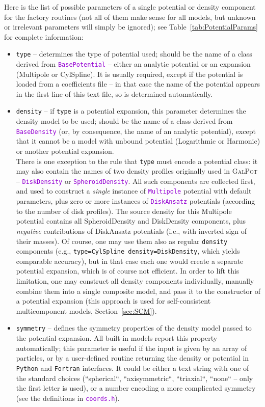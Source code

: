 \documentclass[12pt]{article}
\newcommand{\Python}{\texttt{Python}\xspace}
\newcommand{\Fortran}{\texttt{Fortran}\xspace}
\newcommand{\ttt}[1]{\textcolor{darkviolet}{\texttt{#1}}}
\newcommand{\ppp}[1]{\textcolor{darkolive} {\texttt{#1}}}
\begin{document}
Here is the list of possible parameters of a single potential or density component for the factory routines (not all of them make sense for all models, but unknown or irrelevant parameters will simply be ignored); see Table~\ref{tab:PotentialParams} for complete information:
\begin{itemize}
\item \ppp{type} -- determines the type of potential used; should be the name of a class derived from \ttt{BasePotential} -- either an analytic potential or an expansion (Multipole or CylSpline). It is usually required, except if the potential is loaded from a coefficients file -- in that case the name of the potential appears in the first line of this text file, so is determined automatically.
\item \ppp{density} -- if \ppp{type} is a potential expansion, this parameter determines the density model to be used; should be the name of a class derived from \ttt{BaseDensity} (or, by consequence, the name of an analytic potential), except that it cannot be a model with unbound potential (Logarithmic or Harmonic) or another potential expansion.\\
There is one exception to the rule that \ppp{type} must encode a potential class: it may also contain the names of two density profiles originally used in \textsc{GalPot} -- \ttt{DiskDensity} or \ttt{SpheroidDensity}. All such components are collected first, and used to construct a \textit{single} instance of \ttt{Multipole} potential with default parameters, plus zero or more instances of \ttt{DiskAnsatz} potentials (according to the number of disk profiles). The source density for this Multipole potential contains all SpheroidDensity and DiskDensity components, plus \textit{negative} contributions of DiskAnsatz potentials (i.e., with inverted sign of their masses). Of course, one may use them also as regular \ppp{density} components (e.g., \ppp{type=CylSpline density=DiskDensity}, which yields comparable accuracy), but in that case each one would create a separate potential expansion, which is of course not efficient. In order to lift this limitation, one may construct all density components individually, manually combine them into a single composite model, and pass it to the constructor of a potential expansion (this approach is used for self-consistent multicomponent models, Section~\ref{sec:SCM}).
\item \ppp{symmetry} -- defines the symmetry properties of the density model passed to the potential expansion. All built-in models report this property automatically; this parameter is useful if the input is given by an array of particles, or by a user-defined routine returning the density or potential in \Python and \Fortran interfaces. It could be either a text string with one of the standard choices (``spherical``, ``axisymmetric``, ``triaxial``, ``none`` -- only the first letter is used), or a number encoding a more complicated symmetry (see the definitions in \ttt{coords.h}).

\end{itemize}
\end{document}
